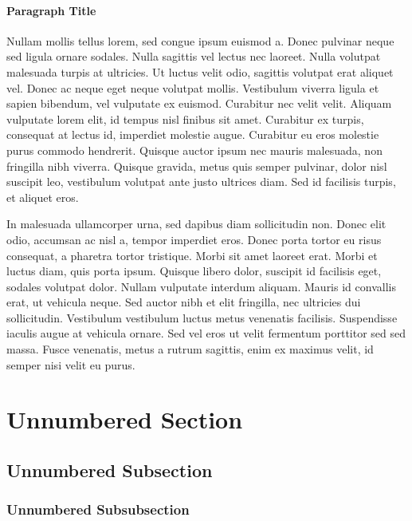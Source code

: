 \documentclass[
	11pt, %
	fleqn, %
	a4paper, %
	oneside, %
]{LegrandOrangeBook}
\begin{document}
\paragraph{Paragraph Title}

Nullam mollis tellus lorem, sed congue ipsum euismod a. Donec pulvinar neque sed ligula ornare sodales. Nulla sagittis vel lectus nec laoreet. Nulla volutpat malesuada turpis at ultricies. Ut luctus velit odio, sagittis volutpat erat aliquet vel. Donec ac neque eget neque volutpat mollis. Vestibulum viverra ligula et sapien bibendum, vel vulputate ex euismod. Curabitur nec velit velit. Aliquam vulputate lorem elit, id tempus nisl finibus sit amet. Curabitur ex turpis, consequat at lectus id, imperdiet molestie augue. Curabitur eu eros molestie purus commodo hendrerit. Quisque auctor ipsum nec mauris malesuada, non fringilla nibh viverra. Quisque gravida, metus quis semper pulvinar, dolor nisl suscipit leo, vestibulum volutpat ante justo ultrices diam. Sed id facilisis turpis, et aliquet eros.

In malesuada ullamcorper urna, sed dapibus diam sollicitudin non. Donec elit odio, accumsan ac nisl a, tempor imperdiet eros. Donec porta tortor eu risus consequat, a pharetra tortor tristique. Morbi sit amet laoreet erat. Morbi et luctus diam, quis porta ipsum. Quisque libero dolor, suscipit id facilisis eget, sodales volutpat dolor. Nullam vulputate interdum aliquam. Mauris id convallis erat, ut vehicula neque. Sed auctor nibh et elit fringilla, nec ultricies dui sollicitudin. Vestibulum vestibulum luctus metus venenatis facilisis. Suspendisse iaculis augue at vehicula ornare. Sed vel eros ut velit fermentum porttitor sed sed massa. Fusce venenatis, metus a rutrum sagittis, enim ex maximus velit, id semper nisi velit eu purus.


\section*{Unnumbered Section}

\subsection*{Unnumbered Subsection}

\subsubsection*{Unnumbered Subsubsection}
\end{document}
